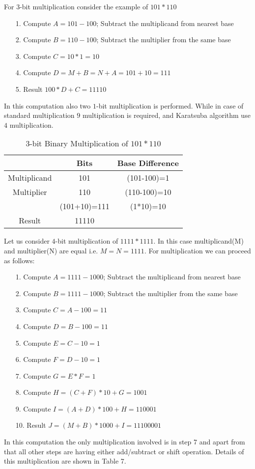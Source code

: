 \documentclass[conference]{IEEEtran}
\begin{document}
\indent For $3$-bit multiplication consider the example of $101*110$
\begin{enumerate}
 \item[1.] Compute $A = 101-100$; Subtract the multiplicand from nearest base 
 \item[2.] Compute $B = 110-100$; Subtract the multiplier from the same base
 \item[3.] Compute $C = 10*1=10 $
 \item[4.] Compute $D = M+B=N+A=101+10=111$ 
 \item[5.] Result  $100*D + C = 11110$
\end{enumerate}
In this computation also two $1$-bit multiplication is performed. While in case of standard multiplication $9$ multiplication is required, and Karatsuba algorithm use $4$ multiplication.
\begin{table}[ht]
\renewcommand{\arraystretch}{1.3}
\caption{$3$-bit Binary Multiplication of $101*110$}
\label{table 6}
\begin{center}
\begin{tabular}{|c| c| c| } 
\hline
 & Bits & Base Difference    \\ [1ex] \hline\hline 
Multiplicand & 101 & (101-100)=1   \\ \hline
Multiplier & 110 & (110-100)=10  \\ \hline
 & (101+10)=111 & (1*10)=10  \\ \hline
Result & 11110 &   \\ [1ex] \hline

\end{tabular} 
\end{center}
\end{table} 

Let us consider $4$-bit multiplication of $1111*1111$. In this case multiplicand(M) and multiplier(N) are equal i.e. $M=N=1111$. For multiplication we can proceed as follows:
\begin{enumerate}
 \item[1.]  Compute $A = 1111-1000$; Subtract the multiplicand from nearest base 
 \item[2.]  Compute $B = 1111-1000$; Subtract the multiplier from the same base
 \item[3.]  Compute $C = A-100=11 $
 \item[4.]  Compute $D = B-100=11 $ 
 \item[5.]  Compute $E = C-10=1$
 \item[6.]  Compute $F = D-10=1$
 \item[7.]  Compute $G = E*F=1$
 \item[8.]  Compute $H = (C+F)*10 + G=1001$
 \item[9.]  Compute $I = (A+D)*100 + H=110001$
 \item[10.] Result  $J = (M+B)*1000 + I=11100001$
\end{enumerate}
In this computation the only multiplication involved is in step 7 and apart from that all other steps are having either add/subtract or shift operation. Details of this multiplication are shown in Table 7.
\end{document}

